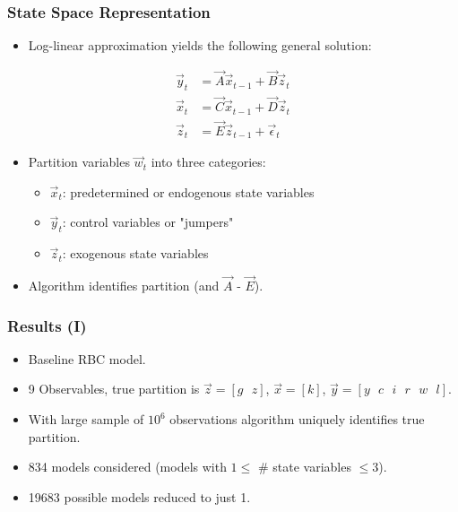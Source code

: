 \documentclass{beamer}
\begin{document}
\begin{frame}
    \frametitle{State Space Representation}
    \begin{itemize}
        \item Log-linear approximation yields the following general solution: 
    \end{itemize}
        \begin{align}
            \vec{y}_t &= \vec{A} \vec{x}_{t-1} + \vec{B} \vec{z}_{t} \label{ss_solution:x}\\
            \vec{x}_t &= \vec{C} \vec{x}_{t-1} + \vec{D} \vec{z}_{t} \label{ss_solution:y}\\
            \vec{z}_t &= \vec{E} \vec{z}_{t-1} + \vec{\epsilon}_{t} \label{ss_solution:z}
        \end{align}
    \begin{itemize}
        \item Partition variables $\vec{w}_t$ into three categories:
        \begin{itemize}
            \item $\vec{x}_t$: predetermined or endogenous state variables
            \item $\vec{y}_t$: control variables or "jumpers"
            \item $\vec{z}_t$: exogenous state variables
        \end{itemize}
        \item Algorithm identifies partition (and $\vec{A}$ - $\vec{E}$).
    \end{itemize}
\end{frame}

\begin{frame}
    \frametitle{Results (I)}
    \begin{itemize}
        \item Baseline RBC model.
        \item 9 Observables, true partition is $\vec{z} = [g \text{ } z]$, $\vec{x} = [k]$, $\vec{y} = [y \text{ } c \text{ } i \text{ } r \text{ } w \text{ } l]$.
        \item With large sample of $10^6$ observations algorithm uniquely identifies true partition.
        \item 834 models considered (models with $1 \leq$ \# state variables $\leq 3$).
        \item 19683 possible models reduced to just 1.
    \end{itemize}
\end{frame}
\end{document}
